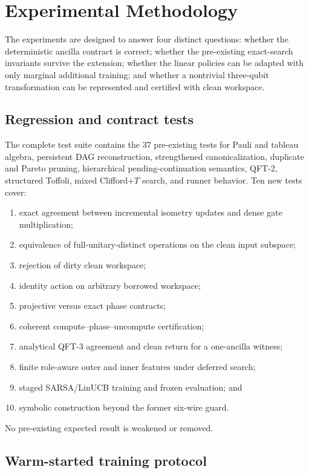 \section{Experimental Methodology}

The experiments are designed to answer four distinct questions: whether the deterministic ancilla contract is correct; whether the pre-existing exact-search invariants survive the extension; whether the linear policies can be adapted with only marginal additional training; and whether a nontrivial three-qubit transformation can be represented and certified with clean workspace.

\subsection{Regression and contract tests}

The complete test suite contains the 37 pre-existing tests for Pauli and tableau algebra, persistent DAG reconstruction, strengthened canonicalization, duplicate and Pareto pruning, hierarchical pending-continuation semantics, QFT-2, structured Toffoli, mixed Clifford+$T$ search, and runner behavior. Ten new tests cover:
\begin{enumerate}
\item exact agreement between incremental isometry updates and dense gate multiplication;
\item equivalence of full-unitary-distinct operations on the clean input subspace;
\item rejection of dirty clean workspace;
\item identity action on arbitrary borrowed workspace;
\item projective versus exact phase contracts;
\item coherent compute--phase--uncompute certification;
\item analytical QFT-3 agreement and clean return for a one-ancilla witness;
\item finite role-aware outer and inner features under deferred search;
\item staged SARSA/LinUCB training and frozen evaluation; and
\item symbolic construction beyond the former six-wire guard.
\end{enumerate}
No pre-existing expected result is weakened or removed.

\subsection{Warm-started training protocol}

